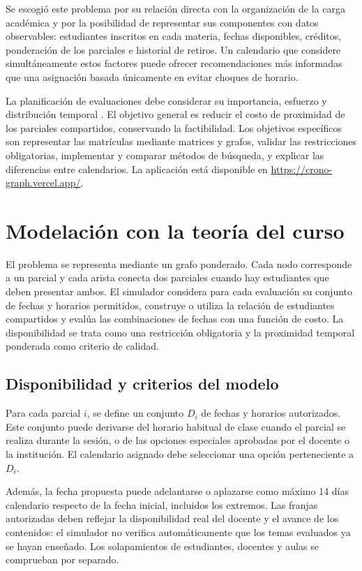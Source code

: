 \documentclass[conference]{IEEEtran}
\begin{document}
Se escogió este problema por su relación directa con la organización de la carga académica y por la posibilidad de representar sus componentes con datos observables: estudiantes inscritos en cada materia, fechas disponibles, créditos, ponderación de los parciales e historial de retiros. Un calendario que considere simultáneamente estos factores puede ofrecer recomendaciones más informadas que una asignación basada únicamente en evitar choques de horario.

La planificación de evaluaciones debe considerar su importancia, esfuerzo y distribución temporal \cite{concordia}. El objetivo general es reducir el costo de proximidad de los parciales compartidos, conservando la factibilidad. Los objetivos específicos son representar las matrículas mediante matrices y grafos, validar las restricciones obligatorias, implementar y comparar métodos de búsqueda, y explicar las diferencias entre calendarios. La aplicación está disponible en \url{https://crono-graph.vercel.app/}.

\section{Modelación con la teoría del curso}
El problema se representa mediante un grafo ponderado. Cada nodo corresponde a un parcial y cada arista conecta dos parciales cuando hay estudiantes que deben presentar ambos. El simulador considera para cada evaluación su conjunto de fechas y horarios permitidos, construye o utiliza la relación de estudiantes compartidos y evalúa las combinaciones de fechas con una función de costo. La disponibilidad se trata como una restricción obligatoria y la proximidad temporal ponderada como criterio de calidad.

\subsection{Disponibilidad y criterios del modelo}
Para cada parcial $i$, se define un conjunto $D_i$ de fechas y horarios autorizados. Este conjunto puede derivarse del horario habitual de clase cuando el parcial se realiza durante la sesión, o de las opciones especiales aprobadas por el docente o la institución. El calendario asignado debe seleccionar una opción perteneciente a $D_i$.

Además, la fecha propuesta puede adelantarse o aplazarse como máximo 14 días calendario respecto de la fecha inicial, incluidos los extremos. Las franjas autorizadas deben reflejar la disponibilidad real del docente y el avance de los contenidos: el simulador no verifica automáticamente que los temas evaluados ya se hayan enseñado. Los solapamientos de estudiantes, docentes y aulas se comprueban por separado.
\end{document}
